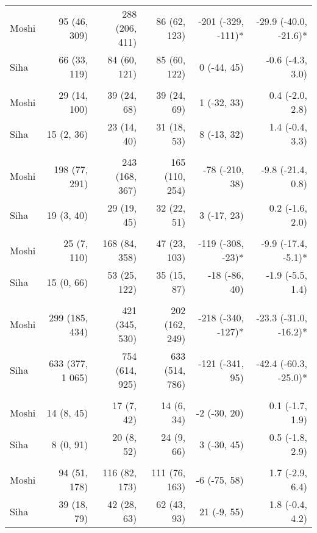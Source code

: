 \begin{table}[t]
\begin{tabular*}{\linewidth}{@{\extracolsep{\fill}}l|rrrrr}
Moshi & 95 (46, 309) & 288 (206, 411) & 86 (62, 123) & -201 (-329, -111)* & -29.9 (-40.0, -21.6)* \\ 
Siha & 66 (33, 119) & 84 (60, 121) & 85 (60, 122) & 0 (-44, 45)  & -0.6 (-4.3, 3.0)  \\ 
\midrule\addlinespace[2.5pt]
\multicolumn{6}{l}{Neuroses} \\[2.5pt] 
\midrule\addlinespace[2.5pt]
Moshi & 29 (14, 100) & 39 (24, 68) & 39 (24, 69) & 1 (-32, 33)  & 0.4 (-2.0, 2.8)  \\ 
Siha & 15 (2, 36) & 23 (14, 40) & 31 (18, 53) & 8 (-13, 32)  & 1.4 (-0.4, 3.3)  \\ 
\midrule\addlinespace[2.5pt]
\multicolumn{6}{l}{Psychoses} \\[2.5pt] 
\midrule\addlinespace[2.5pt]
Moshi & 198 (77, 291) & 243 (168, 367) & 165 (110, 254) & -78 (-210, 38)  & -9.8 (-21.4, 0.8)  \\ 
Siha & 19 (3, 40) & 29 (19, 45) & 32 (22, 51) & 3 (-17, 23)  & 0.2 (-1.6, 2.0)  \\ 
\midrule\addlinespace[2.5pt]
\multicolumn{6}{l}{Dysentery} \\[2.5pt] 
\midrule\addlinespace[2.5pt]
Moshi & 25 (7, 110) & 168 (84, 358) & 47 (23, 103) & -119 (-308, -23)* & -9.9 (-17.4, -5.1)* \\ 
Siha & 15 (0, 66) & 53 (25, 122) & 35 (15, 87) & -18 (-86, 40)  & -1.9 (-5.5, 1.4)  \\ 
\midrule\addlinespace[2.5pt]
\multicolumn{6}{l}{Intestinal Worms} \\[2.5pt] 
\midrule\addlinespace[2.5pt]
Moshi & 299 (185, 434) & 421 (345, 530) & 202 (162, 249) & -218 (-340, -127)* & -23.3 (-31.0, -16.2)* \\ 
Siha & 633 (377, 1 065) & 754 (614, 925) & 633 (514, 786) & -121 (-341, 95)  & -42.4 (-60.3, -25.0)* \\ 
\midrule\addlinespace[2.5pt]
\multicolumn{6}{l}{Neoplasms/Cancer} \\[2.5pt] 
\midrule\addlinespace[2.5pt]
Moshi & 14 (8, 45) & 17 (7, 42) & 14 (6, 34) & -2 (-30, 20)  & 0.1 (-1.7, 1.9)  \\ 
Siha & 8 (0, 91) & 20 (8, 52) & 24 (9, 66) & 3 (-30, 45)  & 0.5 (-1.8, 2.9)  \\ 
\midrule\addlinespace[2.5pt]
\multicolumn{6}{l}{Other Cardiovascular Diseases} \\[2.5pt] 
\midrule\addlinespace[2.5pt]
Moshi & 94 (51, 178) & 116 (82, 173) & 111 (76, 163) & -6 (-75, 58)  & 1.7 (-2.9, 6.4)  \\ 
Siha & 39 (18, 79) & 42 (28, 63) & 62 (43, 93) & 21 (-9, 55)  & 1.8 (-0.4, 4.2)  \\ 

\end{tabular*}
\end{table}

